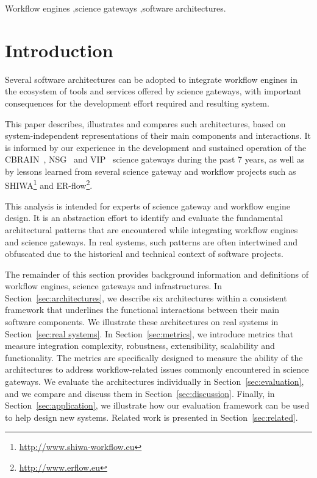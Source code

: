 \documentclass[preprint,3p,twocolumn]{elsarticle}
\newcommand{\correction}[1]{\color{blue}#1\color{black}\xspace}
\begin{document}
\begin{frontmatter}
\begin{keyword}
Workflow engines \sep science gateways \sep software architectures.
\end{keyword}

\end{frontmatter}


\section{Introduction}

Several software architectures can be adopted to integrate workflow
engines in \correction{the ecosystem of tools and services offered by}
science gateways, with important consequences for the development
effort required and resulting system.

This paper describes, \correction{illustrates} and compares such
architectures, based on system-independent representations of their
main components and interactions. It is informed by our experience in
the development and sustained operation of the CBRAIN~\cite{SHER-14},
NSG~\cite{shahand2015data,shahand:2012jgc} and VIP~\cite{GLAT-13}
science gateways during the past 7 years, as well as by lessons
learned from several science gateway and workflow projects such as
SHIWA\footnote{\url{http://www.shiwa-workflow.eu}} and
ER-flow\footnote{\url{http://www.erflow.eu}}.

\correction{This analysis is intended for experts of science gateway
  and workflow engine design. It is an abstraction effort to identify
  and evaluate the fundamental architectural patterns that are
  encountered while integrating workflow engines and science
  gateways. In real systems, such patterns are often intertwined and
  obfuscated due to the historical and
  technical context of software projects.}

\correction{The remainder of this section provides} background
information and definitions of workflow engines, science gateways and
infrastructures. In Section~\ref{sec:architectures}, we describe six
architectures within a consistent framework that underlines the
functional interactions between their main software
components. \correction{We illustrate these architectures on real
  systems in Section~\ref{sec:real systems}.} In
  Section~\ref{sec:metrics}, we introduce metrics that measure
  integration complexity, robustness, extensibility, scalability and
  \correction{functionality}. The metrics are specifically designed to
  measure the ability of the architectures to address workflow-related
  issues commonly encountered in science gateways. \correction{We
    evaluate the architectures individually in
    Section~\ref{sec:evaluation}, and we compare and discuss them in
    Section~\ref{sec:discussion}.} \correction{Finally, in
    Section~\ref{sec:application}, we illustrate how our evaluation
    framework can be used to help design new systems. Related work is
    presented in Section~\ref{sec:related}.}
\end{document}
